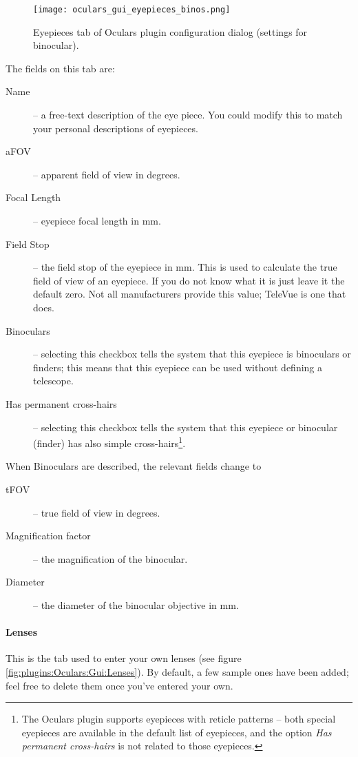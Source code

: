 \begin{figure}[p]\centering
\texttt{[image: oculars\_gui\_eyepieces\_binos.png]}
\caption{Eyepieces tab of Oculars plugin configuration dialog (settings for binocular).}
\label{fig:plugins:Oculars:Gui:Eyepieces_binos}
\end{figure}


The fields on this tab are:
\begin{description}
\item[Name] -- a free-text description of the eye piece. You could modify this to match your personal descriptions of eyepieces.
\item[aFOV] -- apparent field of view in degrees.
\item[Focal Length] -- eyepiece focal length in mm.
\item[Field Stop] -- the field stop of the eyepiece in mm. This is used to calculate the true field of view of an eyepiece. If you do not know what it is just leave it the default zero. Not all manufacturers provide this value; TeleVue is one that does.
\item[Binoculars] -- selecting this checkbox tells the system that this eyepiece is binoculars or finders; this means that this eyepiece can be used without defining a telescope.
\item[Has permanent cross-hairs] -- selecting this checkbox tells the system that this eyepiece or binocular (finder) has also simple cross-hairs\footnote{The Oculars plugin supports eyepieces with reticle patterns -- both special eyepieces are available in the default list of eyepieces, and the option \emph{Has permanent cross-hairs} is not related to those eyepieces.}.
\end{description}
When Binoculars are described, the relevant fields change to
\begin{description}
\item[tFOV] -- true field of view in degrees.
\item[Magnification factor] -- the magnification of the binocular.
\item[Diameter] -- the diameter of the binocular objective in mm.
\end{description}


\paragraph{Lenses}

This is the tab used to enter your own lenses (see figure \ref{fig:plugins:Oculars:Gui:Lenses}). By default, a few sample ones have been added; feel free to delete them once you've entered your own.

